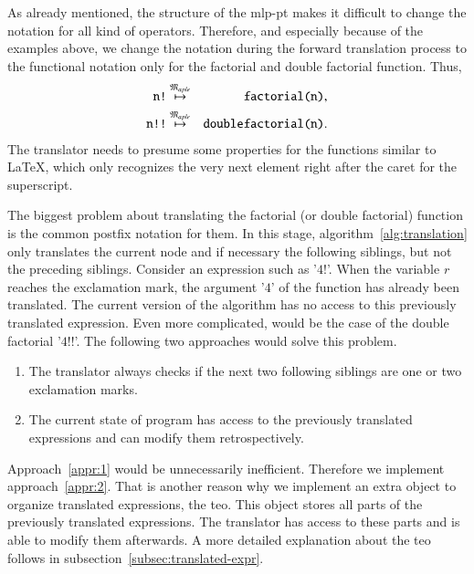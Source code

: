 As already mentioned, the structure of the \gls{mlp-pt} makes it difficult to change the notation for all kind of operators. Therefore, and especially because of the examples above, we change the notation during the forward translation process to the functional notation only for the factorial and double factorial function. Thus,
\begin{eqnarray*}
\verb|n!| &\overset{\langMaple}{\mapsto}& \verb|factorial(n)|,\\
\verb|n!!| &\overset{\langMaple}{\mapsto}& \verb|doublefactorial(n)|.
\end{eqnarray*}
The translator needs to presume some properties for the functions similar to \LaTeX, which only recognizes the very next element right after the caret for the superscript.

The biggest problem about translating the factorial (or double factorial) function is the common postfix notation for them. In this stage, algorithm~\ref{alg:translation} only translates the current node and if necessary the following siblings, but not the preceding siblings. Consider an expression such as '$4!$'. When the variable $r$ reaches the exclamation mark, the argument '$4$' of the function has already been translated. The current version of the algorithm has no access to this previously translated expression. Even more complicated, would be the case of the double factorial '$4!!$'. The following two approaches would solve this problem.

\begin{enumerate}
\item\label{appr:1} The translator always checks if the next two following siblings are one or two exclamation marks.
\item\label{appr:2} The current state of program has access to the previously translated expressions and can modify them retrospectively.
\end{enumerate}

Approach~\ref{appr:1} would be unnecessarily inefficient. Therefore we implement approach~\ref{appr:2}. That is another reason why we implement an extra object to organize translated expressions, the \gls{teo}. This object stores all parts of the previously translated expressions. The translator has access to these parts and is able to modify them afterwards. A more detailed explanation about the \gls{teo} follows in subsection~\ref{subsec:translated-expr}.
\newpage


\newpage

